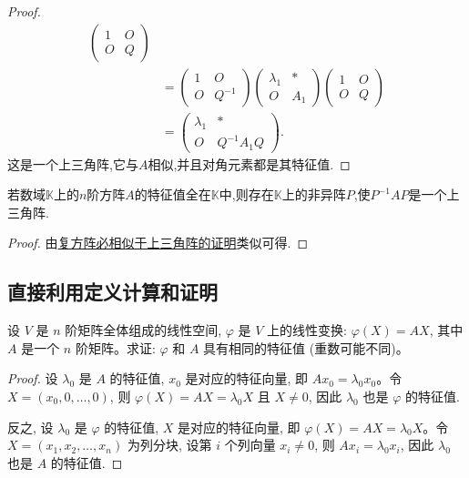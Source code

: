 \documentclass[lang=cn,newtx,10pt,scheme=chinese]{elegantbook}
\begin{document}
\begin{proof}
\begin{align*}
\begin{pmatrix}
1 & O \\
O & Q
\end{pmatrix} \\
&= \begin{pmatrix}
1 & O \\
O & Q^{-1}
\end{pmatrix} \begin{pmatrix}
\lambda_1 & * \\
O & A_1
\end{pmatrix} \begin{pmatrix}
1 & O \\
O & Q
\end{pmatrix} \\
&= \begin{pmatrix}
\lambda_1 & * \\
O & Q^{-1}A_1Q
\end{pmatrix}.
\end{align*}
这是一个上三角阵,它与$A$相似,并且对角元素都是其特征值.
\end{proof}

\begin{corollary}\label{corollary:特征值全在矩阵元素的数域中则一定相似于上三角阵}
若数域$\mathbb{K}$上的$n$阶方阵$A$的特征值全在$\mathbb{K}$中,则存在$\mathbb{K}$上的非异阵$P$,使$P^{-1}AP$是一个上三角阵.
\end{corollary}
\begin{proof}
由\hyperref[theorem:复方阵必相似于上三角阵]{复方阵必相似于上三角阵的证明}类似可得.
\end{proof}

\subsection{直接利用定义计算和证明}

\begin{example}
设 $V$ 是 $n$ 阶矩阵全体组成的线性空间, $\varphi$ 是 $V$ 上的线性变换: $\varphi(X) = AX$, 其中 $A$ 是一个 $n$ 阶矩阵。求证: $\varphi$ 和 $A$ 具有相同的特征值 (重数可能不同)。
\end{example}
\begin{proof}
设 $\lambda_0$ 是 $A$ 的特征值, $x_0$ 是对应的特征向量, 即 $Ax_0 = \lambda_0 x_0$。令 $X = (x_0, 0, \ldots, 0)$, 则 $\varphi(X) = AX = \lambda_0 X$ 且 $X \neq 0$, 因此 $\lambda_0$ 也是 $\varphi$ 的特征值.

反之, 设 $\lambda_0$ 是 $\varphi$ 的特征值, $X$ 是对应的特征向量, 即 $\varphi(X) = AX = \lambda_0 X$。令 $X = (x_1, x_2, \ldots, x_n)$ 为列分块, 设第 $i$ 个列向量 $x_i \neq 0$, 则 $Ax_i = \lambda_0 x_i$, 因此 $\lambda_0$ 也是 $A$ 的特征值.
\end{proof}
\end{document}
